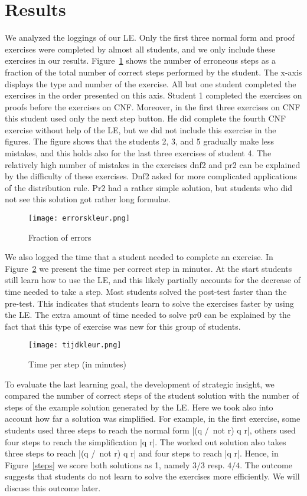 \documentclass[a4paper,UKenglish]{lipics}
\begin{document}
\section{Results}
We analyzed the loggings of our LE. Only the first three normal form and proof
exercises were completed by almost all students, and we only include these
exercises in our results. Figure~\ref{errors} shows the number of erroneous
steps as a fraction of the total number of correct steps performed by the student. The x-axis displays the type and number of the exercise. All but one student completed the exercises in the order presented on this axis. Student 1 completed the exercises on proofs before
the exercises on CNF. Moreover, in the first three exercises on CNF this student
used only the next step button. He did complete the fourth CNF exercise
without help of the LE, but we did not include this
exercise in the figures. The figure shows that the students 2, 3, and 5 gradually 
make less mistakes, and this holds also for the last three exercises of student 4. 
The relatively high number of mistakes in the exercises dnf2 and pr2 can be explained by the 
difficulty of these exercises. Dnf2 asked for more complicated applications of the 
distribution rule. Pr2 had a rather simple solution, but students who did not see this solution got rather long formulae.

\begin{figure}[p]
\center\texttt{[image: errorskleur.png]}
\caption{Fraction of errors}
\label{errors}
\end{figure}

We also logged the time that a student needed to complete an exercise. In
Figure~\ref{tijd} we present the time per correct step in minutes. 
At the start students still learn how to use the LE, and this
likely partially accounts for the decrease of time needed to take a step. Most
students solved the post-test faster than the pre-test. This indicates that
students learn to solve the exercises faster by using the LE. 
The extra amount of time needed to solve pr0 can be explained by the fact that 
this type of exercise was new for this group of students.


\begin{figure}[p]
\center\texttt{[image: tijdkleur.png]}
\caption{Time per step (in minutes)}
\label{tijd}
\end{figure}

To evaluate the last learning goal, the development of strategic insight, we
compared the number of correct steps of the student solution with the number of
steps of the example solution generated by the LE. Here we took also into account how far
a solution was simplified. For example, in the first exercise, some students used
three steps to reach the normal form |(q /\ not r) \/ q \/ r|, others used 
four steps to reach the simplification |q \/ r|. The worked out solution also takes three steps to reach |(q /\ not r) \/ q \/ r| and four steps to reach |q \/ r|. Hence, in Figure~\ref{steps} we score 
both solutions as 1, namely $3/3$ resp. $4/4$. 
The outcome suggests that students do not learn to
solve the exercises more efficiently. We will discuss this outcome later. 
\end{document}
